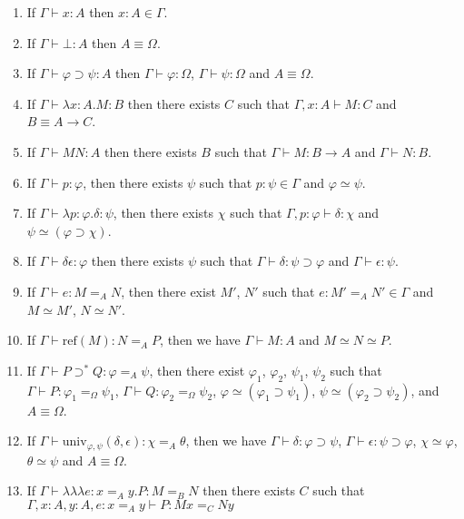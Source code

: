\documentclass[a4paper,UKenglish]{lipics-v2016}
\newcommand*{\reff}[1]{\ensuremath{\mathrm{ref} \left( {#1} \right)}}
\newcommand*{\univ}[4]{\ensuremath{\mathrm{univ}_{{#1}, {#2}} \left({#3} , {#4} \right)}}
\newcommand*{\triplelambda}{\ensuremath{\lambda \!\! \lambda \!\! \lambda}}
\theoremstyle{plain}
\theoremstyle{definition}
\begin{document}
\begin{lemma}[Generation]
$ $
\begin{enumerate}
\item
If $\Gamma \vdash x : A$ then $x : A \in \Gamma$.
\item
If $\Gamma \vdash \bot : A$ then $A \equiv \Omega$.
\item
If $\Gamma \vdash \varphi \supset \psi : A$ then $\Gamma \vdash \varphi : \Omega$, $\Gamma \vdash \psi : \Omega$ and $A \equiv \Omega$.
\item
If $\Gamma \vdash \lambda x:A.M : B$ then there exists $C$ such that $\Gamma, x : A \vdash M : C$ and $B \equiv A \rightarrow C$.
\item
If $\Gamma \vdash MN : A$ then there exists $B$ such that $\Gamma \vdash M : B \rightarrow A$ and $\Gamma \vdash N : B$.
\item
If $\Gamma \vdash p : \varphi$, then there exists $\psi$ such that $p : \psi \in \Gamma$ and $\varphi \simeq \psi$.
\item
If $\Gamma \vdash \lambda p:\varphi.\delta : \psi$, then there exists $\chi$ such that $\Gamma, p : \varphi \vdash \delta : \chi$ and $\psi \simeq (\varphi \supset \chi)$.
\item
If $\Gamma \vdash \delta \epsilon : \varphi$ then there exists $\psi$ such that $\Gamma \vdash \delta : \psi \supset \varphi$ and $\Gamma \vdash \epsilon : \psi$.
\item
If $\Gamma \vdash e : M =_A N$, then there exist $M'$, $N'$ such that $e : M' =_A N' \in \Gamma$ and $M \simeq M'$, $N \simeq N'$.
\item
If $\Gamma \vdash \reff{M} : N =_A P$, then we have $\Gamma \vdash M : A$ and $M \simeq N \simeq P$.
\item
If $\Gamma \vdash P \supset^* Q : \varphi =_A \psi$, then there exist $\varphi_1$, $\varphi_2$, $\psi_1$, $\psi_2$ such that
$\Gamma \vdash P : \varphi_1 =_\Omega \psi_1$, $\Gamma \vdash Q : \varphi_2 =_\Omega \psi_2$, $\varphi \simeq (\varphi_1 \supset \psi_1)$, $\psi \simeq (\varphi_2 \supset \psi_2)$, and $A \equiv \Omega$.
\item
If $\Gamma \vdash \univ{\varphi}{\psi}{\delta}{\epsilon} : \chi =_A \theta$, then we have $\Gamma \vdash \delta : \varphi \supset \psi$, $\Gamma \vdash \epsilon : \psi \supset \varphi$,
$\chi \simeq \varphi$, $\theta \simeq \psi$ and $A \equiv \Omega$.
\item
If $\Gamma \vdash \triplelambda e : x =_A y. P : M =_B N$ then there exists $C$ such that $\Gamma, x : A, y : A, e : x =_A y \vdash P : M x =_C N y$

\end{enumerate}
\end{lemma}
\end{document}
